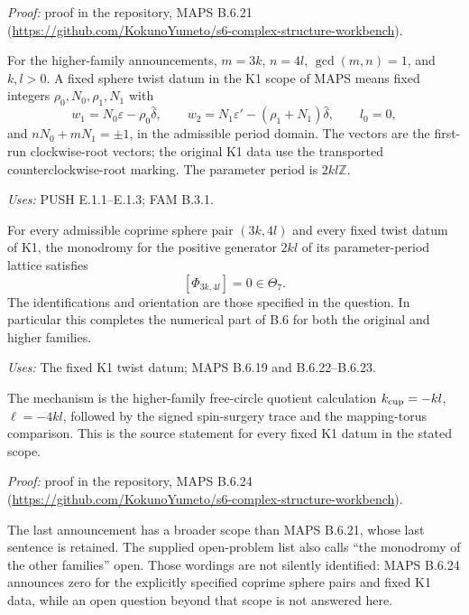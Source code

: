 \noindent\emph{Proof:} proof in the repository, MAPS B.6.21 (\url{https://github.com/KokunoYumeto/s6-complex-structure-workbench}).

\begin{definition}\label{push:E.1.1.scope}
For the higher-family announcements, $m=3k$, $n=4l$,
$\gcd(m,n)=1$, and $k,l>0$. A fixed sphere twist datum in the K1 scope
of MAPS means fixed integers $\rho_0,N_0,\rho_1,N_1$ with
\[
 w_1=N_0\varepsilon-\rho_0\widehat\delta,\qquad
 w_2=N_1\varepsilon'-(\rho_1+N_1)\widehat\delta,\qquad l_0=0,
\]
and $nN_0+mN_1=\pm1$, in the admissible period domain. The vectors are
the first-run clockwise-root vectors; the original K1 data use the
transported counterclockwise-root marking. The parameter period is
$2kl\mathbb Z$.
\end{definition}
\noindent\emph{Uses:} PUSH E.1.1--E.1.3; FAM B.3.1.\par

\begin{announcement}[MAPS B.6.24; A]\label{maps:B.6.24}
For every admissible coprime sphere pair $(3k,4l)$ and every
fixed twist datum of K1, the monodromy for the positive
generator $2kl$ of its parameter-period lattice satisfies
\[
                    [\Phi_{3k,4l}]=0\in\Theta_7.
 \tag{B.6.43}
\]
The identifications and orientation are those specified in
the question.  In particular this completes the numerical
part of B.6 for both the original and higher families.
\end{announcement}
\noindent\emph{Uses:} The fixed K1 twist datum; MAPS B.6.19 and B.6.22--B.6.23.\par

The mechanism is the higher-family free-circle quotient calculation $k_{\rm cup}=-kl$, $\ell=-4kl$, followed by the signed spin-surgery trace and the mapping-torus comparison. This is the source statement for every fixed K1 datum in the stated scope.

\noindent\emph{Proof:} proof in the repository, MAPS B.6.24 (\url{https://github.com/KokunoYumeto/s6-complex-structure-workbench}).

The last announcement has a broader scope than MAPS B.6.21, whose
last sentence is retained. The supplied open-problem list also calls
``the monodromy of the other families'' open. Those wordings are not
silently identified: MAPS B.6.24 announces zero for the explicitly
specified coprime sphere pairs and fixed K1 data, while an open question
beyond that scope is not answered here.
